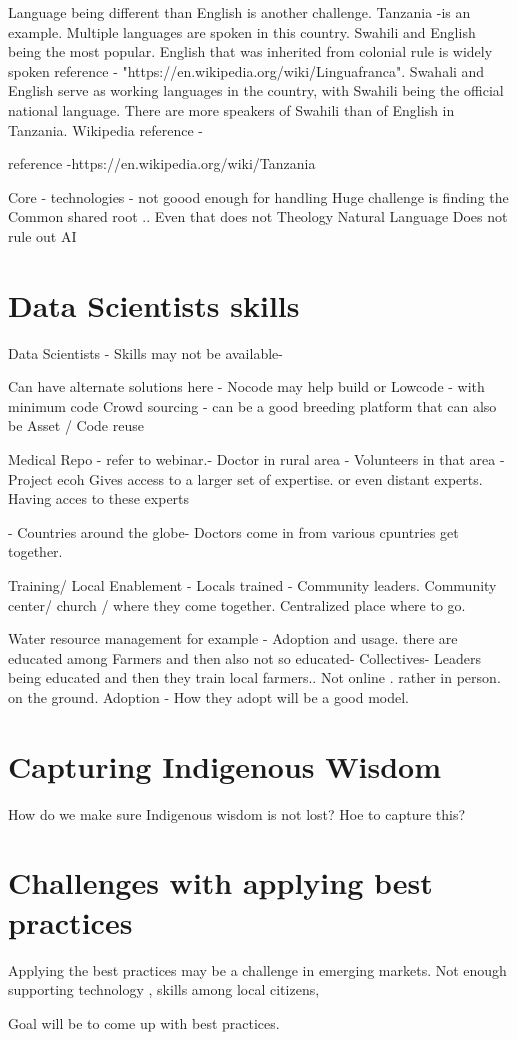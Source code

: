 Language being different than English is another challenge. Tanzania -is an example. Multiple languages are spoken in this country.  Swahili and English being the most popular.   English that was inherited from colonial rule is widely spoken
reference - "https://en.wikipedia.org/wiki/Linguafranca". 
Swahali and English serve as working languages in the country, with Swahili being the official national language.
There are more speakers of Swahili than of English in Tanzania.
Wikipedia reference - 

reference -https://en.wikipedia.org/wiki/Tanzania

Core - technologies - not goood enough for handling
Huge challenge is finding the Common shared root ..  Even that does not 
Theology
Natural Language Does not rule out AI

\section{Data Scientists skills}
\label{sec:data:skills}
\lipsum[2-4]

Data Scientists - Skills may not be available-  

Can have alternate solutions here -
Nocode  may help build or Lowcode -  with minimum code
Crowd sourcing  - can be a good breeding platform that can also be Asset / Code reuse

Medical Repo - refer to webinar.- Doctor in rural area - Volunteers in that area - Project ecoh
Gives access to a larger set of expertise. or even distant experts. Having acces to these experts

- Countries around the globe- Doctors come in from various cpuntries get together.


Training/ Local Enablement - Locals trained - Community leaders. 
Community center/ church / where they come together. 
Centralized place where to go.

Water resource management for example - Adoption and usage. there are educated among Farmers and then also not so educated- 
Collectives- Leaders being educated and then they train local farmers..
Not online . rather in person. on the ground.
Adoption - How they adopt will be a good model.

\section{Capturing Indigenous Wisdom}
\label{sec:data:wisdom}
\lipsum[2-4]

How do we make sure Indigenous wisdom is not lost? 
Hoe to capture this?

\section{Challenges with applying best practices}
\label{sec:data:practice}
\lipsum[2-4]

Applying the best practices may be a challenge in emerging markets. Not enough supporting technology , skills among local citizens, 

Goal will be to come up with best practices.

